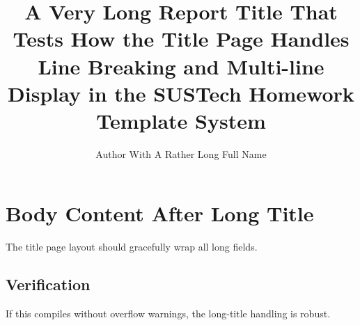 \documentclass[titlepage=formal]{SUSTechHomework}
\title{A Very Long Report Title That Tests How the Title Page Handles Line Breaking
       and Multi-line Display in the SUSTech Homework Template System}
\author{Author With A Rather Long Full Name}
\begin{document}
\maketitle

\section{Body Content After Long Title}
The title page layout should gracefully wrap all long fields.

\subsection{Verification}
If this compiles without overflow warnings, the long-title handling is robust.
\end{document}
